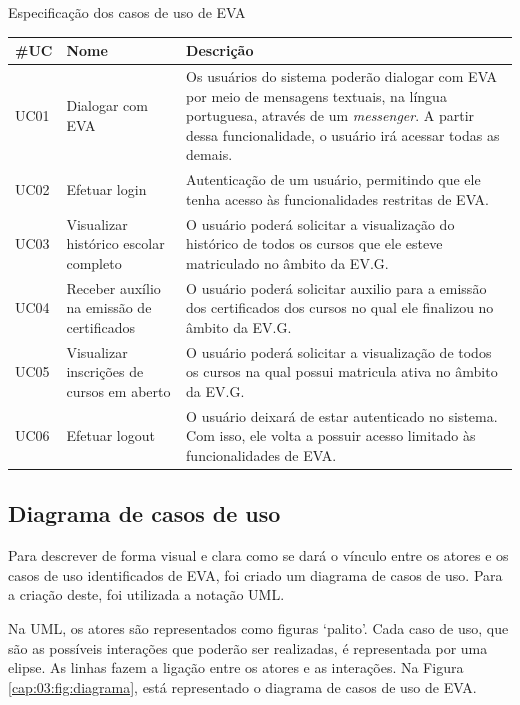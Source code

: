 \begin{quadro}[htb!]
\caption{Especificação dos casos de uso de EVA}
\label{Quadro:Quadro4}
\begin{tabular}{|p{2cm}|p{3cm}|p{7.5cm}|}
  \hline
   \textbf{\#UC} & \textbf{Nome}  & \textbf{Descrição}  \\
   \hline
    UC01 & Dialogar com EVA & Os usuários do sistema poderão dialogar com EVA por meio de mensagens textuais, na língua portuguesa, através de um \textit{messenger}. A partir dessa funcionalidade, o usuário irá acessar todas as demais.\\
   \hline
    UC02 & Efetuar login & Autenticação de um usuário, permitindo que ele tenha acesso às funcionalidades restritas de EVA. \\
   \hline
    UC03 & Visualizar histórico escolar completo & O usuário poderá solicitar a visualização do histórico de todos os cursos que ele esteve matriculado no âmbito da EV.G. \\
   \hline
    UC04 & Receber auxílio na emissão de certificados & O usuário poderá solicitar auxilio para a emissão dos certificados dos cursos no qual ele finalizou no âmbito da EV.G. \\
   \hline
    UC05 & Visualizar inscrições de cursos em aberto & O usuário poderá solicitar a visualização de todos os cursos na qual possui matricula ativa no âmbito da EV.G. \\
   \hline
    UC06 & Efetuar logout & O usuário deixará de estar autenticado no sistema. Com isso, ele volta a possuir acesso limitado às funcionalidades de EVA.\\
   \hline
\end{tabular}
\mfonte
\end{quadro}

\subsection{Diagrama de casos de uso}

Para descrever de forma visual e clara como se dará o vínculo entre os atores e os casos de uso identificados de EVA, foi criado um diagrama de casos de uso. Para a criação deste, foi utilizada a notação UML.

Na UML, os atores são representados como figuras ‘palito’. Cada caso de uso, que são as possíveis interações que poderão ser realizadas, é representada por uma elipse. As linhas fazem a ligação entre os atores e as interações. Na Figura \ref{cap:03:fig:diagrama}, está representado o diagrama de casos de uso de EVA.

